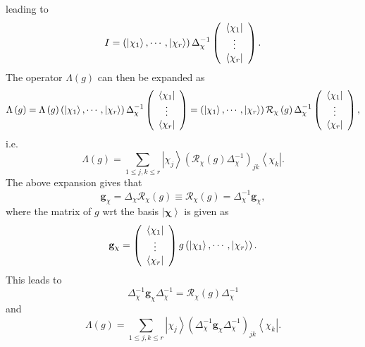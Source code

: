 \documentclass[aps,preprint]{revtex4}%
\begin{document}
leading to
\begin{equation}
I=\left(  \left\vert \chi_{1}\right\rangle ,\cdots,\left\vert \chi
_{r}\right\rangle \right)  \Delta_{\chi}^{-1}\left(
\begin{array}
[c]{c}%
\left\langle \chi_{1}\right\vert \\
\vdots\\
\left\langle \chi_{r}\right\vert
\end{array}
\right)  .
\end{equation}
The operator $\Lambda\left(  g\right)  $ can then be expanded as
\begin{equation}
\Lambda\left(  g\right)  =\Lambda\left(  g\right)  \left(  \left\vert \chi
_{1}\right\rangle ,\cdots,\left\vert \chi_{r}\right\rangle \right)
\Delta_{\chi}^{-1}\left(
\begin{array}
[c]{c}%
\left\langle \chi_{1}\right\vert \\
\vdots\\
\left\langle \chi_{r}\right\vert
\end{array}
\right)  =\left(  \left\vert \chi_{1}\right\rangle ,\cdots,\left\vert \chi
_{r}\right\rangle \right)  \mathcal{R}_{\chi}\left(  g\right)  \Delta_{\chi
}^{-1}\left(
\begin{array}
[c]{c}%
\left\langle \chi_{1}\right\vert \\
\vdots\\
\left\langle \chi_{r}\right\vert
\end{array}
\right)  ,
\end{equation}
i.e.
\begin{equation}
\Lambda\left(  g\right)  =\sum_{1\leq j,k\leq r}\left\vert \chi_{j}%
\right\rangle \left(  \mathcal{R}_{\chi}\left(  g\right)  \Delta_{\chi}%
^{-1}\right)  _{jk}\left\langle \chi_{k}\right\vert .
\end{equation}
The above expansion gives that
\begin{equation}
\mathbf{g}_{\chi}=\Delta_{\chi}\mathcal{R}_{\chi}\left(  g\right)
\equiv\mathcal{R}_{\chi}\left(  g\right)  =\Delta_{\chi}^{-1}\mathbf{g}_{\chi
},
\end{equation}
where the matrix of $g$ wrt the basis $\left\vert \mathbf{\chi}\right\rangle $
is given as
\begin{equation}
\mathbf{g}_{\chi}=\left(
\begin{array}
[c]{c}%
\left\langle \chi_{1}\right\vert \\
\vdots\\
\left\langle \chi_{r}\right\vert
\end{array}
\right)  g\left(  \left\vert \chi_{1}\right\rangle ,\cdots,\left\vert \chi
_{r}\right\rangle \right)  .
\end{equation}
This leads to
\begin{equation}
\Delta_{\chi}^{-1}\mathbf{g}_{\chi}\Delta_{\chi}^{-1}=\mathcal{R}_{\chi
}\left(  g\right)  \Delta_{\chi}^{-1}%
\end{equation}
and
\begin{equation}
\Lambda\left(  g\right)  =\sum_{1\leq j,k\leq r}\left\vert \chi_{j}%
\right\rangle \left(  \Delta_{\chi}^{-1}\mathbf{g}_{\chi}\Delta_{\chi}%
^{-1}\right)  _{jk}\left\langle \chi_{k}\right\vert .
\end{equation}
\end{document}

